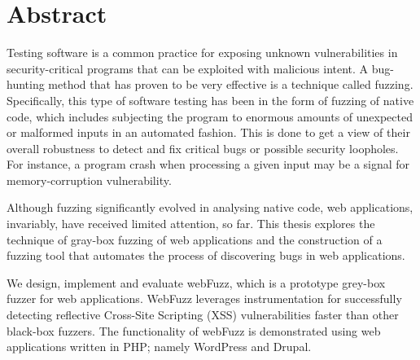 \section*{\LARGE{Abstract}}

Testing software is a common practice for exposing unknown vulnerabilities
in security-critical programs that can be exploited with malicious intent.
A bug-hunting method that has proven to be very effective is a technique
called fuzzing. Specifically, this type of software testing has been in the
form of fuzzing of native code, which includes subjecting the program to
enormous amounts of unexpected or malformed inputs in an automated fashion.
This is done to get a view of their overall robustness to detect and fix
critical bugs or possible security loopholes. For instance, a program crash
when processing a given input may be a signal for memory-corruption
vulnerability.

Although fuzzing significantly evolved in analysing native code, web
applications, invariably, have received limited attention, so far. This thesis
explores the technique of gray-box fuzzing of web applications and the
construction of a fuzzing tool that automates the process of discovering
bugs in web applications.

We design, implement and evaluate webFuzz, which is a prototype grey-box
fuzzer for web applications. WebFuzz leverages instrumentation for successfully
detecting reflective Cross-Site Scripting (XSS) vulnerabilities faster than other
black-box fuzzers. The functionality of webFuzz is demonstrated using web applications
written in PHP; namely WordPress and Drupal.